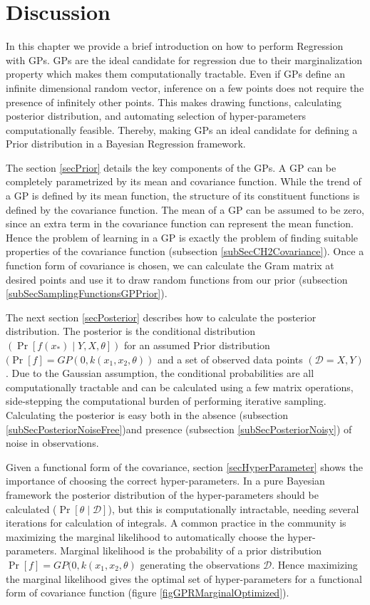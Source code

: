 \section{Discussion}\label{secCH2Discussion}
In this chapter we provide a brief introduction on how to perform Regression with GPs. GPs are the ideal candidate for regression due to their marginalization property which makes them computationally tractable. Even if GPs define an infinite dimensional random vector, inference on a few points does not require the presence of infinitely other points. This makes drawing functions, calculating posterior distribution, and automating selection of hyper-parameters computationally feasible. Thereby, making GPs an ideal candidate for defining a Prior distribution in a Bayesian Regression framework. 

The section \ref{secPrior} details the key components of the GPs. A GP can be completely parametrized by its mean and covariance function. While the trend of a GP is defined by its mean function, the structure of its constituent functions is defined by the covariance function. The mean of a GP can be assumed to be zero, since an extra term in the covariance function can represent the mean function. Hence the problem of learning in a GP is exactly the problem of finding suitable properties of the covariance function (subsection \ref{subSecCH2Covariance}). Once a function form of covariance is chosen, we can calculate the Gram matrix at desired points and use it to draw random functions from our prior (subsection \ref{subSecSamplingFunctionsGPPrior}). 

The next section \ref{secPosterior} describes how to calculate the posterior distribution. The posterior is the conditional distribution $(\Pr[f(x_{*}) \mid Y, X, \theta])$ for an assumed Prior distribution $(\Pr[f] = GP(0, k(x_{1}, x_{2}, \theta))$ and a set of observed data points $(\mathcal{D} = {X, Y})$. Due to the Gaussian assumption, the conditional probabilities are all computationally tractable and can be calculated using a few matrix operations, side-stepping the computational burden of performing iterative sampling. Calculating the posterior is easy both in the absence (subsection \ref{subSecPosteriorNoiseFree})and presence (subsection \ref{subSecPosteriorNoisy}) of noise in observations. 

Given a functional form of the covariance, section \ref{secHyperParameter} shows the importance of choosing the correct hyper-parameters. In a pure Bayesian framework the posterior distribution of the hyper-parameters should be calculated ($\Pr[\theta \mid \mathcal{D}]$), but this is computationally intractable, needing several iterations for calculation of integrals. A common practice in the community is maximizing the marginal likelihood to automatically choose the hyper-parameters. Marginal likelihood is the probability of a prior distribution $\Pr[f] = GP(0, k(x_{1}, x_{2}, \theta)$ generating the observations $\mathcal{D}$. Hence maximizing the marginal likelihood gives the optimal set of hyper-parameters for a functional form of covariance function (figure \ref{figGPRMarginalOptimized}). 


